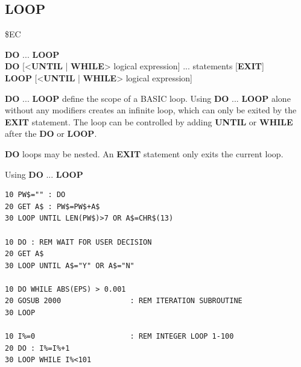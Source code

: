 \subsection{LOOP}
\begin{description}[leftmargin=2cm,style=nextline]
\item [Token:]    \$EC

\item [Format:]   {\bf DO} ... {\bf LOOP} \\
                  {\bf DO} [<{\bf UNTIL} | {\bf WHILE}> logical expression] ... statements [{\bf EXIT}] \\
                  {\bf LOOP} [<{\bf UNTIL} | {\bf WHILE}> logical expression]

\item [Usage:]    {\bf DO} ... {\bf LOOP} define the scope of a BASIC loop. Using {\bf DO} ... {\bf LOOP} alone without any modifiers creates an infinite loop, which can only be exited by the {\bf EXIT} statement. The loop can be controlled by adding {\bf UNTIL} or {\bf WHILE} after the {\bf DO} or {\bf LOOP}.

\item [Remarks:]  {\bf DO} loops may be nested. An {\bf EXIT} statement only exits the current loop.

\item [Examples:] Using {\bf DO} ... {\bf LOOP}

\begin{tcolorbox}[colback=black,coltext=white]
\verbatimfont{\codefont}
\begin{verbatim}
10 PW$="" : DO
20 GET A$ : PW$=PW$+A$
30 LOOP UNTIL LEN(PW$)>7 OR A$=CHR$(13)

10 DO : REM WAIT FOR USER DECISION
20 GET A$
30 LOOP UNTIL A$="Y" OR A$="N"

10 DO WHILE ABS(EPS) > 0.001
20 GOSUB 2000                : REM ITERATION SUBROUTINE
30 LOOP

10 I%=0                      : REM INTEGER LOOP 1-100
20 DO : I%=I%+1
30 LOOP WHILE I%<101
\end{verbatim}
\end{tcolorbox}
\end{description}


\newpage

